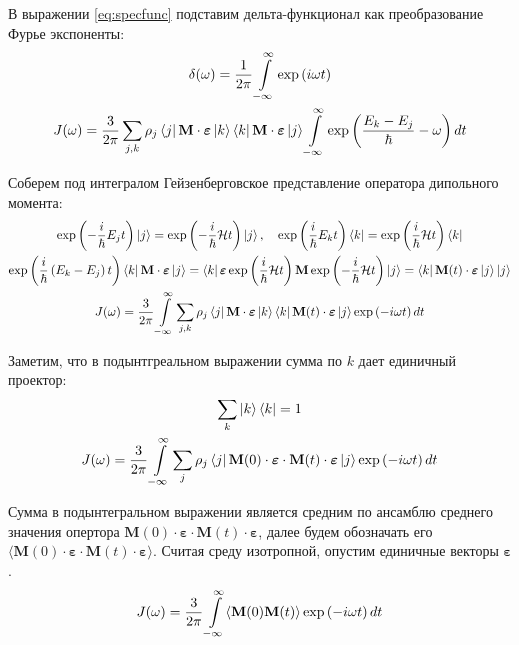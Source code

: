 \documentclass[12pt]{article}
\newcommand{\lb}{\left(}
\newcommand{\rb}{\right)}
\newcommand{\mH}{\mathcal{H}}
\newcommand{\mf}{\mathbf}
\newcommand{\vverh}{\vspace*{-0.15cm}}
\begin{document}
В выражении \eqref{eq:specfunc} подставим дельта-функционал как преобразование Фурье экспоненты:
\vverh
\begin{gather}
	\delta(\omega) = \frac{1}{2 \pi} \int\limits_{-\infty}^{\infty} \exp \lb i \omega t \rb \notag \\
	J(\omega) = \frac{3}{2 \pi} \sum_{j, k} \rho_j \bra{j} \mf{M} \cdot \boldsymbol{\varepsilon} \ket{k} \bra{k} \mf{M} \cdot \boldsymbol{\varepsilon} \ket{j} \int\limits_{-\infty}^{\infty} \exp \lb \frac{E_k - E_j}{\hbar} - \omega \rb dt \notag
\end{gather}

Соберем под интегралом Гейзенберговское представление оператора дипольного момента:
\vverh
\begin{gather}
	\exp \lb - \frac{i}{\hbar} E_j t \rb \ket{j} = \exp \lb - \frac{i}{\hbar} \mH t \rb \ket{j}, \quad \exp \lb \frac{i}{\hbar} E_k t \rb \bra{k} = \exp \lb \frac{i}{\hbar} \mH t \rb \bra{k} \notag \\
	\exp \lb \frac{i}{\hbar} \lb E_k - E_j \rb t \rb \bra{k} \mf{M} \cdot \boldsymbol{\varepsilon} \ket{j} = \bra{k} \boldsymbol{\varepsilon} \exp \lb \frac{i}{\hbar} \mH t \rb \mf{M} \exp \lb - \frac{i}{\hbar} \mH t \rb \ket{j} = \bra{k} \mf{M}(t) \cdot \boldsymbol{\varepsilon} \ket{j} \ket{j} \notag \\
	J(\omega) = \frac{3}{2 \pi} \int\limits_{-\infty}^{\infty} \sum_{j, k} \rho_j \bra{j} \mf{M} \cdot \boldsymbol{\varepsilon} \ket{k} \bra{k} \mf{M}(t) \cdot \boldsymbol{\varepsilon} \ket{j} \exp \lb - i \omega t \rb dt \label{eq:specfunc2} 
\end{gather}

Заметим, что в подынтгреальном выражении сумма по $k$ дает единичный проектор:
\begin{gather}
	\sum_k \ket{k} \bra{k} = 1 \notag \\
	J(\omega) = \frac{3}{2 \pi} \int\limits_{-\infty}^{\infty} \sum_j \rho_j \bra{j}  \mf{M}(0) \cdot \boldsymbol{\varepsilon} \cdot \mf{M}(t) \cdot \boldsymbol{\varepsilon} \ket{j} \exp \lb - i \omega t \rb dt \notag
\end{gather}

Сумма в подынтегральном выражении является средним по ансамблю среднего значения опертора $\mf{M}(0) \cdot \boldsymbol{\varepsilon} \cdot \mf{M}(t) \cdot \boldsymbol{\varepsilon}$, далее будем обозначать его $\langle \mf{M}(0) \cdot \boldsymbol{\varepsilon} \cdot \mf{M}(t) \cdot \boldsymbol{\varepsilon} \rangle$. Считая среду изотропной, опустим единичные векторы $\boldsymbol{\varepsilon}$. 
\vverh
\begin{gather}
	J(\omega) = \frac{3}{2 \pi} \int\limits_{-\infty}^{\infty} \langle \mf{M}(0) \mf{M}(t) \rangle \exp \lb - i \omega t \rb dt \notag
\end{gather}
\end{document}
